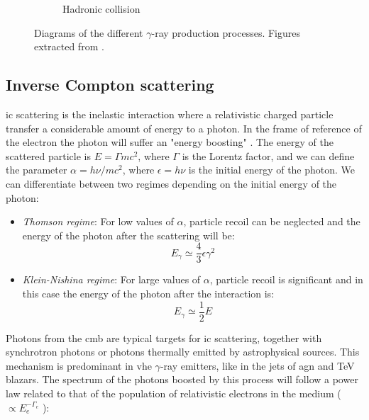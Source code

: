 \documentclass[main.tex]{subfiles}
\begin{document}
\begin{figure}
\begin{subfigure}{0.31\textwidth}
\caption{Hadronic collision} \label{fig:1i} 
\end{subfigure}
\caption{Diagrams of the different $\gamma$-ray production processes. Figures extracted from \cite{OyaVallejo:2010ipa} \label{fig:gammaproductionmec}.}
\end{figure}

\subsection{Inverse Compton scattering}\label{sec:IC}

\gls{ic} scattering is the inelastic interaction where a relativistic charged particle transfer a considerable amount of energy to a photon. In the frame of reference of the electron the photon will suffer an "energy boosting" \cite{weekes2003HEAstrophy}. The energy of the scattered particle is $E = \Gamma m c^2$, where $\Gamma$ is the Lorentz factor, and we can define the parameter $\alpha = h\nu/mc^2$, where $\epsilon = h\nu$ is the initial energy of the photon. We can differentiate between two regimes depending on the initial energy of the photon:

\begin{itemize}
    \item \textit{Thomson regime}: For low values of $\alpha$, particle recoil can be neglected and the energy of the photon after the scattering will be:\\
    \begin{equation}
         E_{\gamma}  \simeq \frac{4}{3}\epsilon \gamma^{2}
    \end{equation}
    
    \item \textit{Klein-Nishina regime}: For large values of $\alpha$, particle recoil is significant and in this case the energy of the photon after the interaction is:
    \begin{equation}
        E_{\gamma}  \simeq \frac{1}{2} E
    \end{equation}
\end{itemize}

Photons from the \gls{cmb} are typical targets for \gls{ic} scattering, together with synchrotron photons or photons thermally emitted by astrophysical sources. This mechanism is predominant in \gls{vhe} $\gamma$-ray emitters, like in the jets of \gls{agn} and TeV blazars. 
The spectrum of the photons boosted by this process will follow a power law related to that of the population of relativistic electrons in the medium ($\propto E_e^{-\Gamma_e}$ ):
\end{document}
